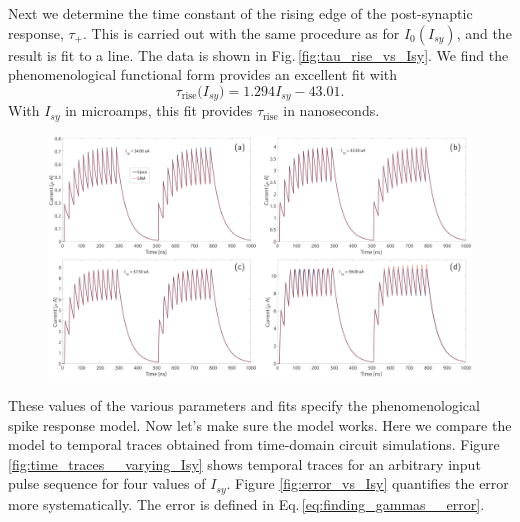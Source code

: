 \documentclass[]{article}
\begin{document}
Next we determine the time constant of the rising edge of the post-synaptic response, $\tau_{+}$. This is carried out with the same procedure as for $I_0(I_{sy})$, and the result is fit to a line. The data is shown in Fig.\,\ref{fig:tau_rise_vs_Isy}.
We find the phenomenological functional form provides an excellent fit with
\begin{equation}
\label{eq:I0_vs_Isy}
\tau_{\mathrm{rise}}\big(I_{sy}\big) =  1.294 I_{sy} - 43.01.
\end{equation}
With $I_{sy}$ in microamps, this fit provides $\tau_{\mathrm{rise}}$ in nanoseconds.

\begin{figure}[t!]
\centering
\includegraphics[width=17.2cm]{_time_traces__varying_Isy.pdf}
\end{figure}
These values of the various parameters and fits specify the phenomenological spike response model. Now let's make sure the model works. Here we compare the model to temporal traces obtained from time-domain circuit simulations. Figure \ref{fig:time_traces__varying_Isy} shows temporal traces for an arbitrary input pulse sequence for four values of $I_{sy}$. Figure \ref{fig:error_vs_Isy} quantifies the error more systematically. The error is defined in Eq.\,\ref{eq:finding_gammas__error}.
\end{document}
